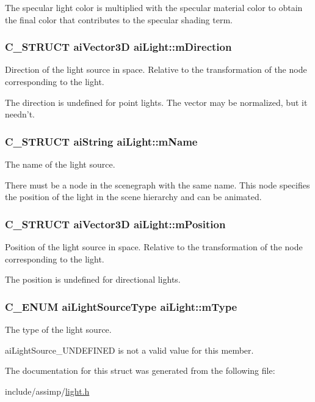 \-The specular light color is multiplied with the specular material color to obtain the final color that contributes to the specular shading term. \hypertarget{structaiLight_af3776d5e4e6065cb6dd7e10dc656dada}{
\subsubsection[{m\-Direction}]{\setlength{\rightskip}{0pt plus 5cm}\-C\-\_\-\-S\-T\-R\-U\-C\-T {\bf ai\-Vector3\-D} {\bf ai\-Light\-::m\-Direction}}}\label{structaiLight_af3776d5e4e6065cb6dd7e10dc656dada}
\-Direction of the light source in space. \-Relative to the transformation of the node corresponding to the light.

\-The direction is undefined for point lights. \-The vector may be normalized, but it needn't. \hypertarget{structaiLight_a92806413f16230728b04e5f379fd00c0}{
\subsubsection[{m\-Name}]{\setlength{\rightskip}{0pt plus 5cm}\-C\-\_\-\-S\-T\-R\-U\-C\-T {\bf ai\-String} {\bf ai\-Light\-::m\-Name}}}\label{structaiLight_a92806413f16230728b04e5f379fd00c0}
\-The name of the light source.

\-There must be a node in the scenegraph with the same name. \-This node specifies the position of the light in the scene hierarchy and can be animated. \hypertarget{structaiLight_a5daf9c9ad2613603b847a527123611f0}{
\subsubsection[{m\-Position}]{\setlength{\rightskip}{0pt plus 5cm}\-C\-\_\-\-S\-T\-R\-U\-C\-T {\bf ai\-Vector3\-D} {\bf ai\-Light\-::m\-Position}}}\label{structaiLight_a5daf9c9ad2613603b847a527123611f0}
\-Position of the light source in space. \-Relative to the transformation of the node corresponding to the light.

\-The position is undefined for directional lights. \hypertarget{structaiLight_a4cba1741875dd92724ff55be91c60c2b}{
\subsubsection[{m\-Type}]{\setlength{\rightskip}{0pt plus 5cm}\-C\-\_\-\-E\-N\-U\-M {\bf ai\-Light\-Source\-Type} {\bf ai\-Light\-::m\-Type}}}\label{structaiLight_a4cba1741875dd92724ff55be91c60c2b}
\-The type of the light source.

ai\-Light\-Source\-\_\-\-U\-N\-D\-E\-F\-I\-N\-E\-D is not a valid value for this member. 

\-The documentation for this struct was generated from the following file\-:\begin{DoxyCompactItemize}
\item 
include/assimp/\hyperlink{light_8h}{light.\-h}\end{DoxyCompactItemize}
